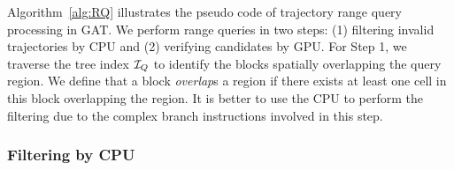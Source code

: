 \documentclass[10pt,conference,letterpaper]{IEEEtran}
\newcommand{\frname}{GAT\xspace }
\newcommand{\treeindex}{{{\cal I}_Q}\xspace}
\begin{document}


Algorithm~\ref{alg:RQ} illustrates the pseudo code of trajectory range query processing in \frname. We perform range queries in two steps: (1) filtering invalid trajectories by CPU and
(2) verifying candidates by GPU. For Step 1, we traverse the tree index $\treeindex$ to identify the blocks spatially overlapping the query region. We define that a block \emph{overlap}s a region if there exists at least one cell in this block overlapping the region.
It is better to use the CPU to perform the filtering due to the complex branch instructions involved in this step.


%

\subsubsection{Filtering by CPU}
\end{document}
